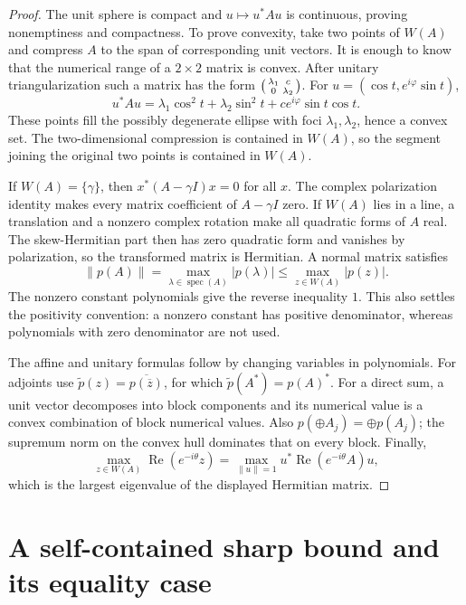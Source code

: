 \documentclass[11pt]{article}
\theoremstyle{definition}
\theoremstyle{remark}
\newcommand{\spec}{\operatorname{spec}}
\newcommand{\Rea}{\operatorname{Re}}
\begin{document}
\begin{proof}
The unit sphere is compact and \(u\mapsto u^*Au\) is continuous, proving
nonemptiness and compactness.  To prove convexity, take two points of \(W(A)\)
and compress \(A\) to the span of corresponding unit vectors.  It is enough to
know that the numerical range of a \(2\times2\) matrix is convex.  After unitary
triangularization such a matrix has the form
\(
 \begin{psmallmatrix}\lambda_1&c\\0&\lambda_2\end{psmallmatrix}
\).
For \(u=(\cos t,e^{i\varphi}\sin t)\),
\[
 u^*Au=\lambda_1\cos^2t+\lambda_2\sin^2t
       +c e^{i\varphi}\sin t\cos t.
\]
These points fill the possibly degenerate ellipse with foci
\(\lambda_1,\lambda_2\), hence a convex set.  The two-dimensional compression
is contained in \(W(A)\), so the segment joining the original two points is
contained in \(W(A)\).

If \(W(A)=\{\gamma\}\), then \(x^*(A-\gamma I)x=0\) for all \(x\).  The complex
polarization identity makes every matrix coefficient of \(A-\gamma I\) zero.
If \(W(A)\) lies in a line, a translation and a nonzero complex rotation make
all quadratic forms of \(A\) real.  The skew-Hermitian part then has zero
quadratic form and vanishes by polarization, so the transformed matrix is
Hermitian.  A normal matrix satisfies
\[
 \|p(A)\|=\max_{\lambda\in\spec(A)}|p(\lambda)|
 \leq\max_{z\in W(A)}|p(z)|.
\]
The nonzero constant polynomials give the reverse inequality \(1\).  This also
settles the positivity convention: a nonzero constant has positive
denominator, whereas polynomials with zero denominator are not used.

The affine and unitary formulas follow by changing variables in polynomials.
For adjoints use \(\widetilde p(z)=\overline{p(\overline z)}\), for which
\(\widetilde p(A^*)=p(A)^*\).  For a direct sum, a unit vector decomposes into block
components and its numerical value is a convex combination of block numerical
values.  Also \(p(\oplus A_j)=\oplus p(A_j)\); the supremum norm on the convex
hull dominates that on every block.  Finally,
\[
 \max_{z\in W(A)}\Rea(e^{-i\theta}z)
 =\max_{\|u\|=1}u^*\Rea(e^{-i\theta}A)u,
\]
which is the largest eigenvalue of the displayed Hermitian matrix.
\end{proof}
\section{A self-contained sharp bound and its equality case}
\end{document}
